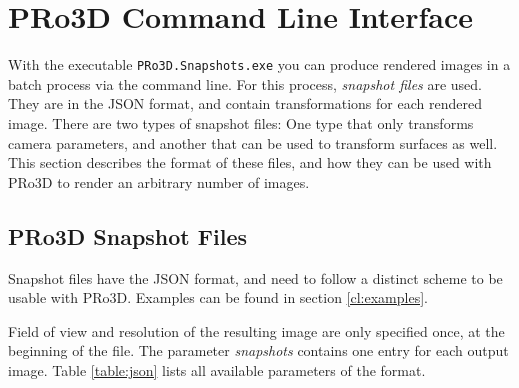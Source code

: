 \section{PRo3D Command Line Interface}\label{sec:CLI}

With the executable \texttt{PRo3D.Snapshots.exe} you can produce rendered images in a batch process via the command line. For this process, \emph{snapshot files} are used. They are in the JSON format, and contain transformations for each rendered image. There are two types of snapshot files: One type that only transforms camera parameters, and another that can be used to transform surfaces as well. This section describes the format of these files, and how they can be used with PRo3D to render an arbitrary number of images.

\subsection{PRo3D Snapshot Files}
\label{sec:snapshots}

Snapshot files have the JSON format, and need to follow a distinct scheme to be usable with PRo3D. Examples can be found in section \ref{cl:examples}.

Field of view and resolution of the resulting image are only specified once, at the beginning of the file. The parameter \textit{snapshots} contains one entry for each output image. Table  \ref{table:json} lists all available parameters of the format.

